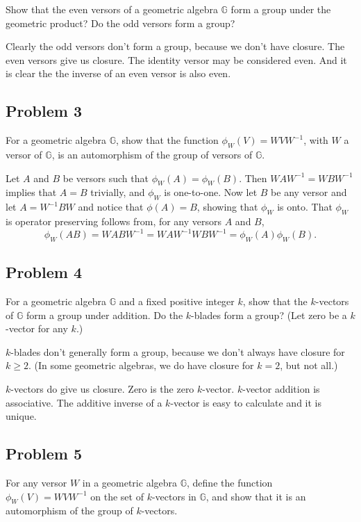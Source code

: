 \documentclass[12pt]{article}
\newcommand{\G}{\mathbb{G}}
\begin{document}
Show that the even versors of a geometric algebra $\G$
form a group under the geometric product?  Do the odd versors form a group?

Clearly the odd versors don't form a group, because we don't have closure.
The even versors give us closure.  The identity versor may be considered even.
And it is clear the the inverse of an even versor is also even.

\subsection*{Problem 3}

For a geometric algebra $\G$, show that
the function $\phi_W(V)=WVW^{-1}$, with $W$ a versor of $\G$,
is an automorphism of the group of versors of $\G$.

Let $A$ and $B$ be versors such that $\phi_W(A)=\phi_W(B)$.
Then $WAW^{-1}=WBW^{-1}$ implies that $A=B$ trivially, and
$\phi_W$ is one-to-one.  Now let $B$ be any versor and
let $A=W^{-1}BW$ and notice that $\phi(A)=B$, showing that
$\phi_W$ is onto.  That $\phi_W$ is operator preserving follows
from, for any versors $A$ and $B$,
\begin{equation*}
\phi_W(AB)=WABW^{-1}=WAW^{-1}WBW^{-1}=\phi_W(A)\phi_W(B).
\end{equation*}

\subsection*{Problem 4}

For a geometric algebra $\G$ and a fixed positive integer $k$, show that the $k$-vectors of $\G$
form a group under addition.  Do the $k$-blades form a group?  (Let zero be a $k$-vector for any $k$.)

$k$-blades don't generally form a group, because we don't always have closure for $k\geq 2$.
(In some geometric algebras, we do have closure for $k=2$, but not all.)

$k$-vectors do give us closure.  Zero is the zero $k$-vector.  $k$-vector addition is associative.
The additive inverse of a $k$-vector is easy to calculate and it is unique.

\subsection*{Problem 5}

For any versor $W$ in a geometric algebra $\G$, define
the function $\phi_W(V)=WVW^{-1}$ on the set of $k$-vectors in $\G$,
and show that it is an automorphism of the group of $k$-vectors.
\end{document}
